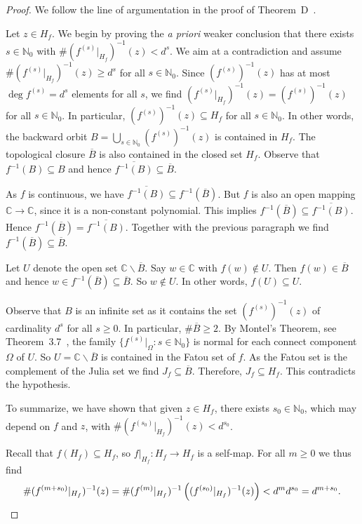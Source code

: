 \documentclass[12pt,oneside,a4]{amsart}
\newcommand{\IC}{\mathbb{C}}
\newcommand{\IN}{\mathbb{N}}
\numberwithin{maincounter}{section}
\numberwithin{equation}{section}
\renewcommand{\subset}{\subseteq}
\newcommand{\ssm}{\smallsetminus}
\begin{document}
\begin{proof}
  We follow the line of argumentation in the proof of 
  Theorem~D~\cite{AlsedaFagella}.
  
  Let $z\in H_f$. We begin by proving the \textit{a priori}
  weaker conclusion that
  there exists $s\in\IN_0$ with
  $\#(f^{(s)}|_{H_f})^{-1}(z)<d^s$.
  We aim at a contradiction and assume 
  $\# (f^{(s)}|_{H_f})^{-1}(z) \ge d^{s}$ for all $s\in\IN_0$.
  Since $(f^{(s)})^{-1}(z)$ has at most $\deg f^{(s)} = d^s$ elements
  for all $s$, we find
  $(f^{(s)}|_{H_f})^{-1}(z) = (f^{(s)})^{-1}(z)$ for all $s\in\IN_0$.
  In particular,
  $(f^{(s)})^{-1}(z)  \subset H_f$ for all $s\in\IN_0$.
  In other words, 
  the backward orbit  $B = \bigcup_{s\in\IN_0} (f^{(s)})^{-1}(z)$ is
  contained in  $ H_f$.
  The topological closure $\overline B$ is also contained in the
  closed set $H_f$. 
  Observe that $f^{-1}(B)\subset B$
  and hence $\overline{f^{-1}(B)}\subset \overline B$.
  
  As $f$ is continuous, we have $\overline{f^{-1}(B)}\subset
  f^{-1}(\overline B)$. But $f$ is also an open mapping
  $\IC\rightarrow\IC$, since it is a non-constant polynomial. This
  implies
  $f^{-1}(\overline B)\subset\overline{f^{-1}(B)}$.
  Hence $f^{-1}(\overline B)=\overline{f^{-1}(B)}$. Together with the
  previous paragraph we find $f^{-1}(\overline B)\subset \overline B$.

  Let $U$ denote the open set $\IC\ssm
  \overline B$.
  Say $w\in \IC$ with $f(w)\not\in U$. Then $f(w)\in \overline B$ and
  hence
  $w\in f^{-1}(\overline B)\subset \overline B$. So $w\not\in U$. In
  other words,  $f(U) \subset U$.

  Observe that $B$ is an infinite set as it contains the set
  $(f^{(s)})^{-1}(z)$ of cardinality $d^s$ for all $s\ge 0$. 
  In particular, $\#\overline B\ge 2$. By Montel's Theorem, see
  Theorem~3.7~\cite{Milnor}, the family $\{f^{(s)}|_\Omega : s\in\IN_0\}$ is
  normal for each connect component $\Omega$ of $U$.
  So $U=\IC\ssm \overline B$ is contained in the Fatou set of
  $f$. As the Fatou set is the complement of the Julia set we find
  $J_f\subset \overline B$. Therefore, $J_f \subset  H_f$. This
  contradicts the hypothesis.

  To summarize, we have shown that given $z\in H_f$, there exists
  $s_0\in\IN_0$, which may depend on $f$ and $z$, with $\#
  (f^{(s_0)}|_{H_f})^{-1}(z) < d^{s_0}$.


  Recall that $f(H_f)\subset H_f$, so $f|_{H_f}\colon H_f\rightarrow
  H_f$ is a self-map. For all  $m\ge 0$ we thus find
  \begin{equation*}
    \# (f^{(m+s_0)}|_{H_f})^{-1}(z) = \#
    (f^{(m)}|_{H_f})^{-1}\left((f^{(s_0)}|_{H_f})^{-1}(z)\right)
    < d^{m}d^{s_0}=d^{m+s_0}.\qedhere
  \end{equation*}
\end{proof}
\end{document}
